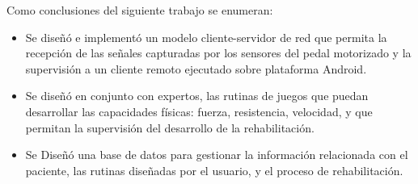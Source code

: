 \begin{conclusions}
    Como conclusiones del siguiente trabajo se enumeran:
    \begin{itemize}
        \item Se diseñó e implementó  un modelo cliente-servidor de red que permita la
        recepción de las señales capturadas por los sensores del pedal motorizado
        y la supervisión a un cliente remoto ejecutado sobre plataforma Android.
        \item Se diseñó en conjunto con expertos, las rutinas de juegos que
        puedan desarrollar las capacidades físicas: fuerza, resistencia, velocidad, y que
        permitan la supervisión del desarrollo de la rehabilitación.
        \item Se Diseñó una base de datos para gestionar la información relacionada con
        el paciente, las rutinas diseñadas por el usuario, y el proceso de
        rehabilitación.
    \end{itemize}
\end{conclusions}